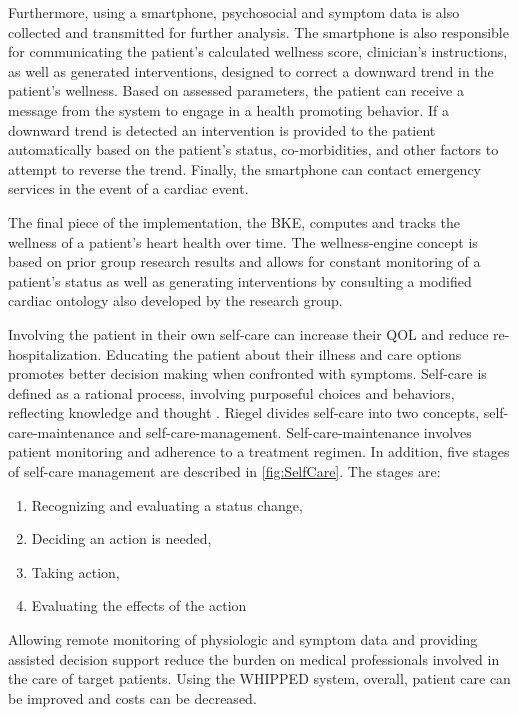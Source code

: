 Furthermore, using a smartphone, psychosocial and symptom data is also collected and transmitted for further analysis. The smartphone is also responsible for communicating the patient's calculated wellness score, clinician's instructions, as well as generated interventions, designed to correct a downward trend in the patient's wellness.  Based on assessed parameters, the patient can receive a message from the system to engage in a health promoting behavior. If a downward trend is detected an intervention is provided to the patient automatically based on the patient's status, co-morbidities, and other factors to attempt to reverse the trend. Finally, the smartphone can contact emergency services in the event of a cardiac event.

The final piece of the implementation, the BKE, computes and tracks the wellness of a patient's heart health over time. The wellness-engine concept is based on prior group research results \cite{Chaiyasucheeva2012} and allows for constant monitoring of a patient's status as well as generating interventions by consulting a modified cardiac ontology also developed by the research group.

Involving the patient in their own self-care can increase their QOL and reduce re-hospitalization. Educating the patient about their illness and care options promotes better decision making when confronted with symptoms.  Self-care is defined as a rational process, involving purposeful choices and behaviors, reflecting knowledge and thought \cite{Riegel2008}. Riegel divides self-care into two concepts, self-care-maintenance and self-care-management.  Self-care-maintenance involves patient monitoring and adherence to a treatment regimen.  In addition, five stages of self-care management are described in \cref{fig:SelfCare}\cite{Riegel2008}. The stages are:

\begin{enumerate}
\item  Recognizing and evaluating a status change, 
\item  Deciding an action is needed, 
\item  Taking action, 
\item  Evaluating the effects of the action
\end{enumerate}
 Allowing remote monitoring of physiologic and symptom data and providing assisted decision support reduce the burden on medical professionals involved in the care of target patients. Using the WHIPPED system, overall, patient care can be improved and costs can be decreased. 

